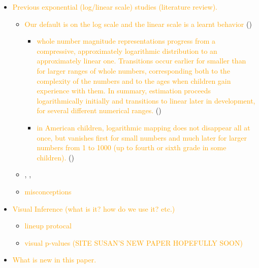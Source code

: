 \documentclass[]{interact}
\theoremstyle{plain}%
\theoremstyle{definition}
\theoremstyle{remark}
\def\tightlist{}
\begin{document}
\begin{itemize}
\item
  \textcolor{Orange}{Previous exponential (log/linear scale) studies (literature review).}

  \begin{itemize}
  \item
    \textcolor{Orange}{Our default is on the log scale and the linear scale is a learnt behavior}
    (\citet{varshney_why_2013})

    \begin{itemize}
    \tightlist
    \item
      \textcolor{Orange}{whole number magnitude representations progress from a compressive, approximately logarithmic distribution to an approximately linear one. Transitions occur earlier for smaller than for larger ranges of whole numbers, corresponding both to the complexity of the numbers and to the ages when children gain experience with them. In summary, estimation proceeds logarithmically initially and transitions to linear later in development, for several different numerical ranges.}
      (\citet{siegler_numerical_2017})
    \item
      \textcolor{Orange}{in American children, logarithmic mapping does not disappear all at once, but vanishes first for small numbers and much later for larger numbers from 1 to 1000 (up to fourth or sixth grade in some children).}
      (\citet{dehaeneLogLinearDistinct2008})
    \end{itemize}
  \item
    \citet{jones_generalized_1979}, \citet{jones_polynomial_1977},
    \citet{wagenaar_extrapolation_1978}
  \item
    \textcolor{Orange}{misconceptions} \citet{menge_logarithmic_2018}
  \end{itemize}
\item
  \textcolor{Orange}{Visual Inference (what is it? how do we use it? etc.)}

  \begin{itemize}
  \item
    \textcolor{Orange}{lineup protocal} \citet{buja_statistical_2009}
  \item
    \textcolor{Orange}{visual p-values (SITE SUSAN'S NEW PAPER HOPEFULLY SOON)}
  \end{itemize}
\item
  \textcolor{Orange}{What is new in this paper.}
\end{itemize}
\end{document}
